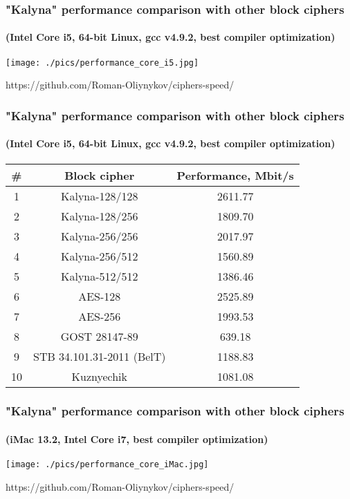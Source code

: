 \documentclass[12pt,mathserif]{beamer}
\begin{document}
	\begin{frame}
		\frametitle {"Kalyna" performance comparison with other block ciphers}
		\framesubtitle{(Intel Core i5, 64-bit Linux, gcc v4.9.2, best compiler optimization)}
		
		\begin{center}
			\texttt{[image: ./pics/performance\_core\_i5.jpg]}
			
			\begin{tiny}
				https://github.com/Roman-Oliynykov/ciphers-speed/
			\end{tiny}
		
		\end{center}
	
	\end{frame}		
	
	\begin{frame}
		\frametitle {"Kalyna" performance comparison with other block ciphers}
		\framesubtitle{(Intel Core i5, 64-bit Linux, gcc v4.9.2, best compiler optimization)}
		
		\begin{table}
			 \begin{center}
			  \begin{tabular}{ | c | c | c | }
			    \hline
			    \# & Block cipher & Performance, Mbit/s \\ \hline
			    1 & Kalyna-128/128 & 2611.77 \\ \hline
				2 & Kalyna-128/256 &	1809.70 \\ \hline
				3 & Kalyna-256/256 &	2017.97 \\ \hline
				4 & Kalyna-256/512 &	1560.89 \\ \hline
				5 & Kalyna-512/512 &	1386.46 \\ \hline
				6 & AES-128 & 2525.89 \\ \hline
				7 & AES-256 & 1993.53 \\ \hline
				8 & GOST 28147-89 &	639.18 \\ \hline
				9 & STB 34.101.31-2011 (BelT) & 1188.83 \\ \hline
				10 & Kuznyechik & 1081.08 \\ \hline
			  \end{tabular}
			 \end{center} 
			\end{table}
		
	\end{frame}

	\begin{frame}
		\frametitle {"Kalyna" performance comparison with other block ciphers}
		\framesubtitle{(iMac 13.2, Intel Core i7, best compiler optimization)}
		
		\begin{center}
			\texttt{[image: ./pics/performance\_core\_iMac.jpg]}
			
			\begin{tiny}
				https://github.com/Roman-Oliynykov/ciphers-speed/
			\end{tiny}
		
		\end{center}
	
	\end{frame}		
	
\end{document}
